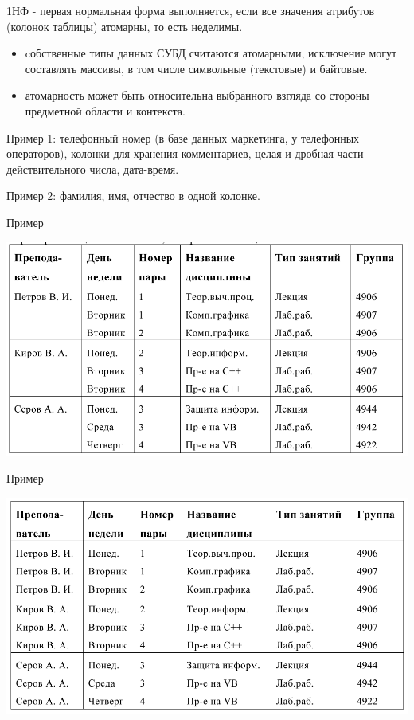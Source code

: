 \documentclass{beamer}
\begin{document}
\begin{frame}
\begin{block}{1НФ - первая нормальная форма}
выполняется, если все значения атрибутов (колонок таблицы) атомарны, то есть неделимы.
\end{block}
\begin{itemize}
\item cобственные типы данных СУБД считаются атомарными, исключение
могут составлять массивы, в том числе символьные (текстовые) и байтовые.
\item атомарность может быть относительна выбранного взгляда со стороны предметной области и контекста. \end{itemize}
Пример 1: телефонный номер (в базе данных маркетинга, у телефонных операторов), колонки для хранения комментариев, целая и дробная части действительного числа, дата-время.

Пример 2: фамилия, имя, отчество в одной колонке.
\end{frame} 

\begin{frame}
\begin{block}{Пример}
\begin{center}
\includegraphics[scale=0.4]{images/nf-0.png}
\end{center}
\end{block}
\end{frame}

\begin{frame}
\begin{block}{Пример}
\begin{center}
\includegraphics[scale=0.4]{images/nf-1.png}
\end{center}
\end{block}
\end{frame}
\end{document}
